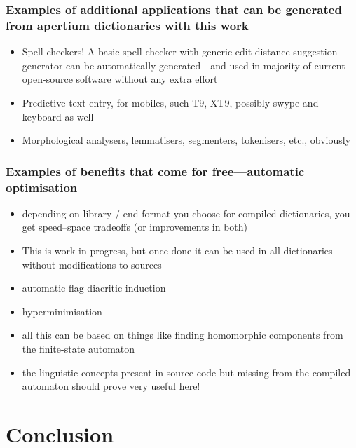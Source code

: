 \documentclass{beamer}
\begin{document}
\begin{frame}
    \frametitle{Examples of additional applications that can be generated from
    apertium dictionaries with this work}
    \begin{itemize}
        \item Spell-checkers! A basic spell-checker with generic edit distance
            suggestion generator can be automatically generated---and used in
            majority of current open-source software without any extra effort
        \item Predictive text entry, for mobiles, such T9, XT9, possibly swype
            and keyboard as well
        \item Morphological analysers, lemmatisers, segmenters, tokenisers,
            etc., obviously
    \end{itemize}
\end{frame}

\begin{frame}
    \frametitle{Examples of benefits that come for free---automatic optimisation}
    \begin{itemize}
        \item depending on library / end format you choose for compiled
            dictionaries, you get speed--space tradeoffs (or improvements in
            both)
        \item This is work-in-progress, but once done it can be used in all
            dictionaries without modifications to sources
        \item automatic flag diacritic induction
        \item hyperminimisation
        \item all this can be based on things like finding homomorphic
            components from the finite-state automaton
        \item the linguistic concepts present in source code but missing from
            the compiled automaton should prove very useful here!
    \end{itemize}
\end{frame}

\section{Conclusion}
\end{document}
